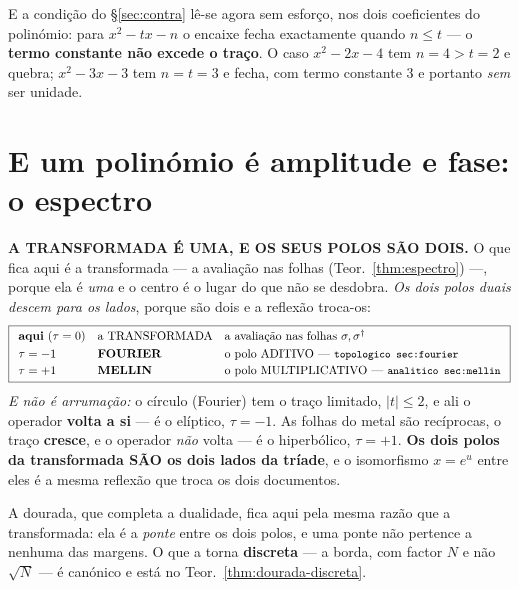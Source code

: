 \documentclass[11pt,a4paper]{article}
\newcommand{\code}[1]{\texttt{\small #1}}
\newcommand{\abs}[1]{\lvert #1\rvert}
\newcommand{\dg}{^{\dagger}}
\begin{document}
\noindent E a condição do \S\ref{sec:contra} lê-se agora sem esforço, nos dois
coeficientes do polinómio: para $x^{2}-tx-n$ o encaixe fecha exactamente quando
$n\leq t$ --- o \textbf{termo constante não excede o traço}. O caso
$x^{2}-2x-4$ tem $n=4>t=2$ e quebra; $x^{2}-3x-3$ tem $n=t=3$ e fecha, com termo
constante $3$ e portanto \emph{sem} ser unidade.

\section{E um polinómio é amplitude e fase: o espectro}\label{sec:espectro}

\noindent\textbf{A TRANSFORMADA É UMA, E OS SEUS POLOS SÃO DOIS.} O que fica aqui é a
transformada --- a avaliação nas folhas (Teor.~\ref{thm:espectro}) ---, porque ela é
\emph{uma} e o centro é o lugar do que não se desdobra. \emph{Os dois polos duais descem
para os lados}, porque são dois e a reflexão troca-os:
\[
\boxed{
\begin{array}{lll}
\textbf{aqui} \ (\tau=0) & \text{a TRANSFORMADA} & \text{a avaliação nas folhas } \sigma,\sigma\dg\\[3pt]
\tau=-1 & \textbf{FOURIER} & \text{o polo ADITIVO --- \code{topologico sec:fourier}}\\[2pt]
\tau=+1 & \textbf{MELLIN} & \text{o polo MULTIPLICATIVO --- \code{analitico sec:mellin}}
\end{array}}
\]
\emph{E não é arrumação:} o círculo (Fourier) tem o traço limitado, $\abs{t}\leq2$, e ali o
operador \textbf{volta a si} --- é o elíptico, $\tau=-1$. As folhas do metal são
recíprocas, o traço \textbf{cresce}, e o operador \emph{não} volta --- é o hiperbólico,
$\tau=+1$. \textbf{Os dois polos da transformada SÃO os dois lados da tríade}, e o
isomorfismo $x=e^{u}$ entre eles é a mesma reflexão que troca os dois documentos.

\medskip
\noindent A dourada, que completa a dualidade, fica aqui pela mesma razão que a
transformada: ela é a \emph{ponte} entre os dois polos, e uma ponte não pertence a nenhuma
das margens. O que a torna \textbf{discreta} --- a borda, com factor $N$ e não $\sqrt N$
--- é canónico e está no Teor.~\ref{thm:dourada-discreta}.
\end{document}
